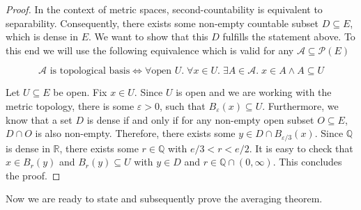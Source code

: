 \begin{proof}
In the context of metric spaces, second-countability is equivalent to separability. Consequently, there exists some non-empty countable subset $D \subseteq E$, which is dense in $E$. We want to show that this $D$ fulfills the statement above. To this end we will use the following equivalence which is valid for any $\mathcal{A} \subseteq \mathcal{P}(E)$

\[
	\mathcal{A} \textrm{ is topological basis} \Longleftrightarrow \forall \textrm{open } U.\; \forall x \in U.\; \exists A \in \mathcal{A}.\; x \in A \wedge A \subseteq U
\]

Let $U \subseteq E$ be open. Fix $x \in U$. Since $U$ is open and we are working with the metric topology, there is some $\varepsilon > 0$, such that $B_\varepsilon(x) \subseteq U$. Furthermore, we know that a set $D$ is dense if and only if for any non-empty open subset $O \subseteq E$, $D \cap O$ is also non-empty. Therefore, there exists some $y \in D \cap B_{\varepsilon/3}(x)$. Since $\mathbb{Q}$ is dense in $\mathbb{R}$, there exists some $r \in \mathbb{Q}$ with $e/3 < r < e/2$. It is easy to check that $x \in B_r(y)$ and $B_r(y) \subseteq U$ with $y \in D$ and $r \in \mathbb{Q} \cap (0, \infty)$. This concludes the proof.
\end{proof}
Now we are ready to state and subsequently prove the averaging theorem.


